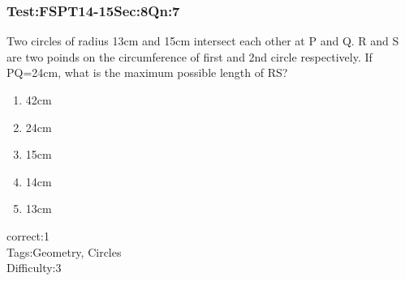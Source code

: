 \documentclass[]{beamer}
\begin{document}
    \begin{frame}
	    \frametitle{Test:FSPT14-15\hspace{2mm}Sec:8\hspace{2mm}Qn:7}
	    Two circles of radius 13cm and 15cm intersect each other at P and Q. R and S are two poinds on the circumference of first and 2nd circle respectively. If PQ=24cm, what is the maximum possible length of RS?
	    \begin{enumerate}
	        \item
	           42cm 
	        \item
	           24cm
	        \item
	           15cm
	        \item
	            14cm
	        \item
	            13cm
	    \end{enumerate}
	    correct:1  \\   
	    Tags:Geometry, Circles    \\
	    Difficulty:3   \\
    \end{frame}
\end{document}
